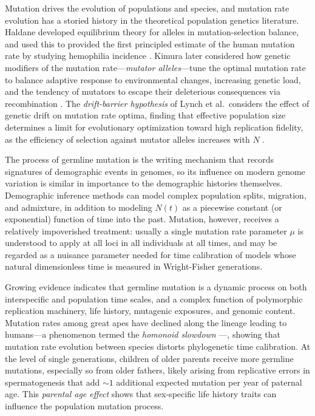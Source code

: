 \documentclass[11pt]{article}
\begin{document}
Mutation drives the evolution of populations and species, and mutation rate evolution has a storied history in the theoretical population genetics literature.
Haldane developed equilibrium theory for alleles in mutation-selection balance, and used this to provided the first principled estimate of the human mutation rate by studying hemophilia incidence \cite{Haldane2004-ov, Nachman2004-gh}.
Kimura later considered how genetic modifiers of the mutation rate---\emph{mutator alleles}---tune the optimal mutation rate to balance adaptive response to environmental changes, increasing genetic load, and the tendency of mutators to escape their deleterious consequences via recombination \cite{Kimura1967-ku}.
The \emph{drift-barrier hypothesis} of Lynch et al.\ considers the effect of genetic drift on mutation rate optima, finding that effective population size determines a limit for evolutionary optimization toward high replication fidelity, as the efficiency of selection against mutator alleles increases with $N$ \cite{Lynch2016-ff}.

The process of germline mutation is the writing mechanism that records signatures of demographic events in genomes, so its influence on modern genome variation is similar in importance to the demographic histories themselves.
Demographic inference methods can model complex population splits, migration, and admixture, in addition to modeling $N(t)$ as a piecewise constant (or exponential) function of time into the past.
Mutation, however, receives a relatively impoverished treatment: usually a single mutation rate parameter $\mu$ is understood to apply at all loci in all individuals at all times, and may be regarded as a nuisance parameter needed for time calibration of models whose natural dimensionless time is measured in Wright-Fisher generations.

Growing evidence indicates that germline mutation is a dynamic process on both interspecific and population time scales, and a complex function of polymorphic replication machinery, life history, mutagenic exposures, and genomic content.
Mutation rates among great apes have declined along the lineage leading to humans---a phenomenon termed the \emph{homonoid slowdown} \cite{Goodman1985-xc, Scally2012-rb}---, showing that mutation rate evolution between species distorts phylogenetic time calibration.
At the level of single generations, children of older parents receive more germline mutations, especially so from older fathers, likely arising from replicative errors in spermatogenesis that add $\sim 1$ additional expected mutation per year of paternal age.
This \emph{parental age effect} \cite{} shows that sex-specific life history traits can influence the population mutation process.
\end{document}
